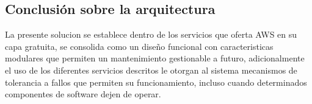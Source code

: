 \subsection{Conclusión sobre la arquitectura}

La presente solucion se establece dentro de los servicios que oferta AWS en su capa gratuita, se consolida como un diseño funcional con caracteristicas modulares que permiten un mantenimiento gestionable a futuro, adicionalmente el uso de los diferentes servicios descritos le otorgan al sistema mecanismos de tolerancia a fallos que permiten su funcionamiento, incluso cuando determinados componentes de software dejen de operar.
